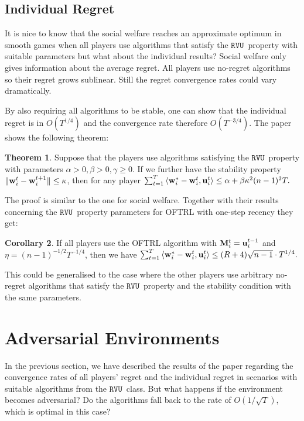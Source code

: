 \documentclass[a4paper]{article}
\theoremstyle{definition}
\newtheorem{theorem}{Theorem}
\newtheorem{corollary}[theorem]{Corollary}
\newcommand{\myprop}{\ensuremath{\texttt{RVU}}}
\newcommand{\mst}{\ensuremath{w}}
\newcommand{\stable}{\ensuremath{\kappa}}
\renewcommand{\vec}[1]{\ensuremath{{\bf #1}}}
\newcommand{\dotp}[2]{\ensuremath{\left\langle #1, #2 \right\rangle}}
\begin{document}
\subsection{Individual Regret}
It is nice to know that the social welfare reaches an approximate
optimum in smooth games when all players use algorithms that satisfy
the \myprop~property with suitable parameters but what about the
individual results?
Social welfare only gives information about the average regret.
All players use no-regret algorithms so their regret grows sublinear.
Still the regret convergence rates could vary dramatically.

By also requiring all algorithms to be stable, one can show that the
individual regret is in $O(T^{1/4})$ and the convergence rate
therefore $O(T^{-3/4})$.
The paper shows the following theorem:
\setcounter{theorem}{10}
\begin{theorem}\label{thm:sufficient-2}
Suppose that the players use algorithms satisfying the
\myprop~property with parameters $\alpha > 0, \beta > 0,\gamma \geq
0$. If we further have the stability property $\|\vec{\mst}_i^t -
\vec{\mst}_i^{t+1}\|\leq \stable$, then for any player
$\sum_{t=1}^{T} \dotp{\vec{\mst}_i^*-\vec{\mst}_i^t}{ \vec{u}_i^t}\leq
\alpha + \beta \stable^2 (n-1)^2 T.$
\end{theorem}

The proof is similar to the one for social welfare.
Together with their results concerning the \myprop~property parameters for OFTRL with one-step recency they get:

\begin{corollary}\label{cor:oftrl-bound}
If all players use the OFTRL algorithm with $\vec{M}_i^t =
\vec{u}_i^{t-1}$ and $\eta = (n-1)^{-1/2}T^{-1/4}$, then we have
$\sum_{t=1}^{T} \dotp{\vec{\mst}_i^*-\vec{\mst}_i^t}{ \vec{u}_i^t}\leq
(R+4)\sqrt{n-1}\cdot T^{1/4}.$
\end{corollary}

This could be generalised to the case where the other players use
arbitrary no-regret algorithms that satisfy the \myprop~property and
the stability condition with the same parameters.



\section{Adversarial Environments}
In the previous section, we have described the results of the paper
regarding the convergence rates of all players'
regret and the individual regret in
scenarios with suitable algorithms from the \myprop~class.
But what happens if the environment becomes adversarial?
Do the algorithms fall back to the rate of $O(1/\sqrt{T})$, which is optimal
in this case?
\end{document}
